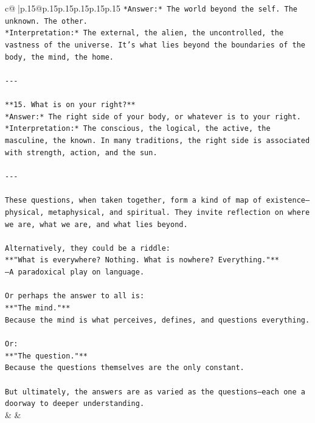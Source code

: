 \documentclass{article}
\begin{document}
{\begin{supertabular}{c@{$\;$}|p{.15\linewidth}@{}p{.15\linewidth}p{.15\linewidth}p{.15\linewidth}p{.15\linewidth}p{.15\linewidth}}
{{{\texttt{*Answer:* The world beyond the self. The unknown. The other.  } \\
\texttt{*Interpretation:* The external, the alien, the uncontrolled, the vastness of the universe. It's what lies beyond the boundaries of the body, the mind, the home.} \\
\\ 
\texttt{{-}{-}{-}} \\
\\ 
\texttt{**15. What is on your right?**  } \\
\texttt{*Answer:* The right side of your body, or whatever is to your right.  } \\
\texttt{*Interpretation:* The conscious, the logical, the active, the masculine, the known. In many traditions, the right side is associated with strength, action, and the sun.} \\
\\ 
\texttt{{-}{-}{-}} \\
\\ 
\texttt{These questions, when taken together, form a kind of map of existence—physical, metaphysical, and spiritual. They invite reflection on where we are, what we are, and what lies beyond.} \\
\\ 
\texttt{Alternatively, they could be a riddle:  } \\
\texttt{**"What is everywhere? Nothing. What is nowhere? Everything."**  } \\
\texttt{—A paradoxical play on language.} \\
\\ 
\texttt{Or perhaps the answer to all is:  } \\
\texttt{**"The mind."**  } \\
\texttt{Because the mind is what perceives, defines, and questions everything.} \\
\\ 
\texttt{Or:  } \\
\texttt{**"The question."**  } \\
\texttt{Because the questions themselves are the only constant.} \\
\\ 
\texttt{But ultimately, the answers are as varied as the questions—each one a doorway to deeper understanding.} \\
            }
        }
    }
    & & \\ \\


\end{supertabular}}
\end{document}
